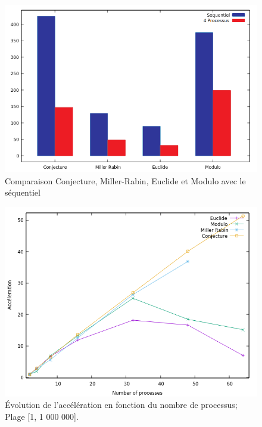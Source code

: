	\begin{frame}
	\begin{figure}[!ht]	
		\begin{center}\includegraphics[scale=0.4]{Bar1.png}\end{center}
		\caption{Comparaison Conjecture, Miller-Rabin, Euclide et Modulo avec le séquentiel}
		\label{fg:fig3}
	\end{figure}	
	\end{frame}
		
	\begin{frame}
	\begin{figure}[!ht]	
		\begin{center}\includegraphics[scale=0.55]{Acc_All_1M_v2.png}\end{center}
		\caption{Évolution de l’accélération en fonction du nombre de processus; \\Plage [1, 1 000 000].}
		\label{fg:fig4}
	\end{figure}	
	\end{frame}
	
